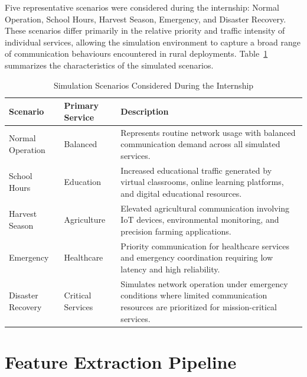 \documentclass[12pt,a4paper]{report}
\begin{document}
	Five representative scenarios were considered during the internship: Normal Operation, School Hours, Harvest Season, Emergency, and Disaster Recovery. These scenarios differ primarily in the relative priority and traffic intensity of individual services, allowing the simulation environment to capture a broad range of communication behaviours encountered in rural deployments. Table~\ref{tab:scenarios} summarizes the characteristics of the simulated scenarios.
	
	\begin{table}[H]
		\centering
		\caption{Simulation Scenarios Considered During the Internship}
		\label{tab:scenarios}
		
		\begin{tabular}{|p{3.5cm}|p{3cm}|p{8cm}|}
			\hline
			
			\textbf{Scenario} &
			\textbf{Primary Service} &
			\textbf{Description}
			\\
			\hline
			
			Normal Operation &
			Balanced &
			Represents routine network usage with balanced communication demand across all simulated services.
			\\
			\hline
			
			School Hours &
			Education &
			Increased educational traffic generated by virtual classrooms, online learning platforms, and digital educational resources.
			\\
			\hline
			
			Harvest Season &
			Agriculture &
			Elevated agricultural communication involving IoT devices, environmental monitoring, and precision farming applications.
			\\
			\hline
			
			Emergency &
			Healthcare &
			Priority communication for healthcare services and emergency coordination requiring low latency and high reliability.
			\\
			\hline
			
			Disaster Recovery &
			Critical Services &
			Simulates network operation under emergency conditions where limited communication resources are prioritized for mission-critical services.
			\\
			\hline
			
		\end{tabular}
		
	\end{table}
	
\section{Feature Extraction Pipeline}
\label{sec:feature_extraction}
\end{document}
